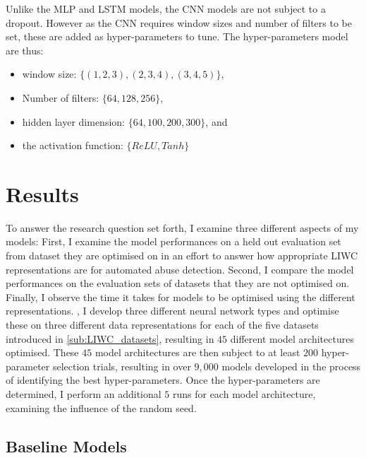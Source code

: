 
Unlike the MLP and LSTM models, the CNN models are not subject to a dropout.
However as the CNN requires window sizes and number of filters to be set, these are added as hyper-parameters to tune. The hyper-parameters  model are thus:

\begin{itemize}
  \item window size: $\{(1, 2, 3), (2, 3, 4), (3, 4, 5)\}$,
  \item Number of filters: $\{64, 128, 256\}$,
  \item hidden layer dimension: $\{64, 100, 200, 300\}$, and
  \item the activation function: $\{ReLU, Tanh\}$
\end{itemize}

\section{Results}
To answer the research question set forth, I examine three different aspects of my models: 
First, I examine the model performances on a held out evaluation set from dataset they are optimised on in an effort to answer how appropriate LIWC representations are for automated abuse detection.
Second, I compare the model performances on the evaluation sets of datasets that they are not optimised on.
Finally, I observe the time it takes for models to be optimised using the different representations.
, I develop three different neural network types and optimise these on three different data representations for each of the five datasets introduced in \cref{sub:LIWC_datasets}, resulting in $45$ different model architectures optimised.
These $45$ model architectures are then subject to at least $200$ hyper-parameter selection trials, resulting in over $9,000$ models developed in the process of identifying the best hyper-parameters.
Once the hyper-parameters are determined, I perform an additional $5$ runs for each model architecture, examining the influence of the random seed.

\subsection{Baseline Models}

